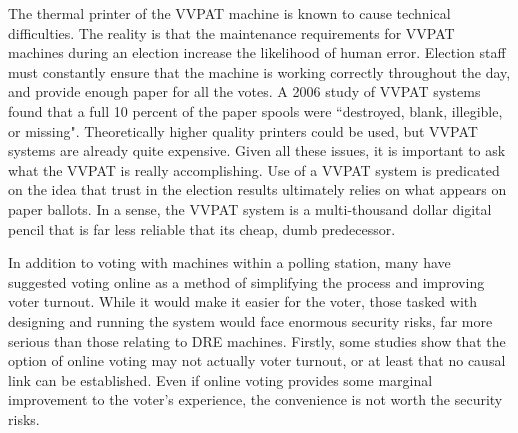 \documentclass[12pt, titlepage]{article}
\begin{document}
The thermal printer of the VVPAT machine is known to cause technical difficulties. The reality is that the maintenance requirements for VVPAT machines during an election increase the likelihood of human error. Election staff must constantly ensure that the machine is working correctly throughout the day, and provide enough paper for all the votes. A 2006 study of VVPAT systems found that a full 10 percent of the paper spools were ``destroyed, blank, illegible, or missing". \cite{goggin2007examination} Theoretically higher quality printers could be used, but VVPAT systems are already quite expensive. Given all these issues, it is important to ask what the VVPAT is really accomplishing. Use of a VVPAT system is predicated on the idea that trust in the election results ultimately relies on what appears on paper ballots. In a sense, the VVPAT system is a multi-thousand dollar digital pencil that is far less reliable that its cheap, dumb predecessor.

In addition to voting with machines within a polling station, many have suggested voting online as a method of simplifying the process and improving voter turnout. While it would make it easier for the voter, those tasked with designing and running the system would face enormous security risks, far more serious than those relating to DRE machines. Firstly, some studies show that the option of online voting may not actually voter turnout, or at least that no causal link can be established. \cite{germann2017internet} \cite{estonianturnout} Even if online voting provides some marginal improvement to the voter's experience, the convenience is not worth the security risks. 
\end{document}

